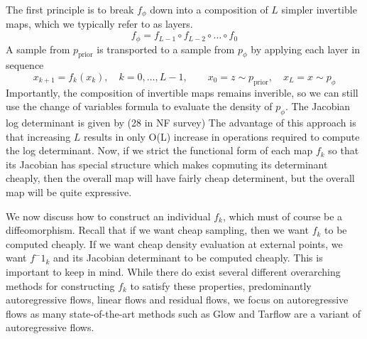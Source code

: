 \documentclass[12pt,a4paper]{report}
\begin{document}
The first principle is to break $f_\phi$ down into a composition of $L$ simpler invertible maps, which we typically refer to as layers.  
$$ f_\phi = f_{L-1} \circ f_{L-2} \circ \dots \circ f_0$$
A sample from $p_\text{prior}$ is transported to a sample from $p_\phi$ by applying each layer in sequence
\begin{equation}
\label{eq:DNF_layers}
    x_{k+1} = f_k(x_k), \quad k = 0, \dots, L-1, \qquad x_0 = z \sim p_{\text{prior}}, \quad x_L = x \sim p_\phi
\end{equation}
Importantly, the composition of invertible maps remains inverible, so we can still use the change of variables formula to evaluate the density of $p_\phi$. The Jacobian log determinant is given by
(28 in NF survey)
The advantage of this approach is that increasing $L$ results in only O(L) increase in operations required to compute the log determinant. 
Now, if we strict the functional form of each map $f_k$ so that its Jacobian has special structure which makes copmuting its determinant cheaply, then the overall map will have fairly cheap determinent, but the overall map will be quite expressive. %

We now discuss how to construct an individual $f_k$, which must of course be a diffeomorphism.  
Recall that if we want cheap sampling, then we want $f_k$ to be computed cheaply. 
If we want cheap density evaluation at external points, we want $f^-1_k$ and its Jacobian determinant to be computed cheaply.
This is important to keep in mind. 
While there do exist several different overarching methods for constructing $f_k$ to satisfy these properties, predominantly autoregressive flows, linear flows and residual flows, we focus on autoregressive flows as many state-of-the-art methods such as Glow and Tarflow are a variant of autoregressive flows. 

\end{document}
